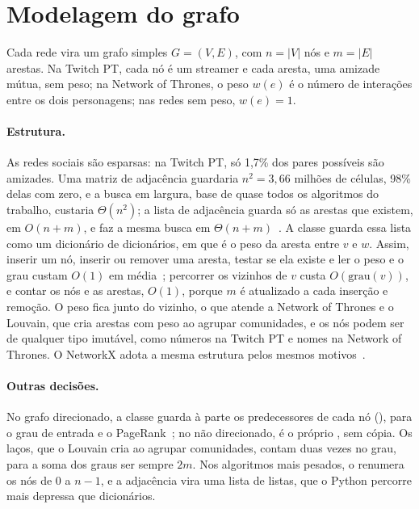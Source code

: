 \section{Modelagem do grafo}\label{sec:modelagem}

Cada rede vira um grafo simples $G = (V, E)$, com $n = |V|$ nós e $m = |E|$ arestas. Na Twitch PT,
cada nó é um streamer e cada aresta, uma amizade mútua, sem peso; na Network of Thrones, o peso
$w(e)$ é o número de interações entre os dois personagens; nas redes sem peso, $w(e) = 1$.

\paragraph{Estrutura.} As redes sociais são esparsas: na Twitch PT, só 1,7\% dos pares possíveis
são amizades. Uma matriz de adjacência guardaria $n^2 = 3{,}66$ milhões de células, 98\% delas com
zero, e a busca em largura, base de quase todos os algoritmos do trabalho, custaria $\Theta(n^2)$; a
lista de adjacência guarda só as arestas que existem, em $O(n + m)$, e faz a mesma busca em
$\Theta(n + m)$~\cite{cormen2022}. A classe  guarda essa lista como um dicionário de
dicionários, em que  é o peso da aresta entre $v$ e $w$. Assim, inserir um nó,
inserir ou remover uma aresta, testar se ela existe e ler o peso e o grau custam $O(1)$ em
média~\cite{pythoncomplexidade}; percorrer os vizinhos de $v$ custa $O(\text{grau}(v))$, e contar os
nós e as arestas, $O(1)$, porque $m$ é atualizado a cada inserção e remoção. O peso fica junto do
vizinho, o que atende a Network of Thrones e o Louvain, que cria arestas com peso ao agrupar
comunidades, e os nós podem ser de qualquer tipo imutável, como números na Twitch PT e nomes na
Network of Thrones. O NetworkX adota a mesma estrutura pelos mesmos motivos~\cite{hagberg2008}.

\paragraph{Outras decisões.} No grafo direcionado, a classe guarda à parte os predecessores de cada
nó (), para o grau de entrada e o PageRank~\cite{brin1998}; no não direcionado,
 é o próprio , sem cópia. Os laços, que o Louvain cria ao agrupar
comunidades, contam duas vezes no grau, para a soma dos graus ser sempre $2m$. Nos algoritmos mais
pesados, o  renumera os nós de $0$ a $n-1$, e a adjacência vira uma lista de
listas, que o Python percorre mais depressa que dicionários.

